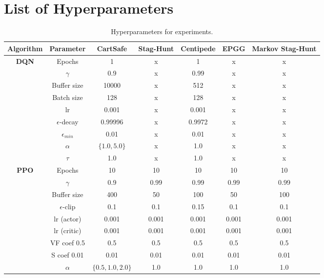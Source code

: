 \section{List of Hyperparameters}\label{appsec:hyperparams}


\begin{table}[!h]
\centering
\begin{tabular}{|c|c|c|c|c|c|c|}
\hline
\textbf{Algorithm} & \textbf{Parameter} & \textbf{CartSafe} & \textbf{Stag-Hunt} & \textbf{Centipede} & \textbf{EPGG} & \textbf{Markov Stag-Hunt} \\
\hline\hline
\multirow{9}{*}{\textbf{DQN}} & Epochs & 1 & x & 1 & x & x \\
\cline{2-7}
& $\gamma$ & 0.9 & x & 0.99 & x & x \\
\cline{2-7}
& Buffer size & 10000  & x & 512 & x & x \\
\cline{2-7}
& Batch size & 128 & x & 128& x & x \\
\cline{2-7}
& lr & 0.001 & x & 0.001 & x & x \\
\cline{2-7}
& $\epsilon$-decay & 0.99996 & x & 0.9972 & x & x \\
\cline{2-7}
& $\epsilon_{min}$ & 0.01 & x & 0.01 & x & x \\
\cline{2-7}
& $\alpha$ & $\{1.0,5.0\}$ & x & 1.0 & x & x \\
\cline{2-7}
& $\tau$ & 1.0 & x & 1.0 & x & x \\
\hline\hline
\multirow{9}{*}{\textbf{PPO}} & Epochs & 10  & 10 &  10 & 10 & 10 \\
\cline{2-7}
& $\gamma$ & 0.9 & 0.99 & 0.99 & 0.99 & 0.99 \\
\cline{2-7}
& Buffer size & 400 & 50 & 100 & 50 & 100 \\ %
\cline{2-7}
& $\epsilon$-clip & 0.1 & 0.1 & 0.15 & 0.1 & 0.1 \\
\cline{2-7}
& lr (actor) & 0.001 & 0.001 & 0.001 & 0.001 & 0.001 \\
\cline{2-7}
& lr (critic) & 0.001 & 0.001 & 0.001 & 0.001 & 0.001 \\
\cline{2-7}
& VF coef 0.5 & 0.5 & 0.5 & 0.5 & 0.5 & 0.5 \\
\cline{2-7}
& S coef 0.01 & 0.01  & 0.01 & 0.01 & 0.01 & 0.01 \\
\cline{2-7}
& $\alpha$ & $\{0.5,1.0,2.0\}$  & 1.0 & 1.0 & 1.0 & 1.0 \\
\hline
\end{tabular}
\caption{Hyperparameters for experiments. }
\label{table:hyperparams}
\end{table}



